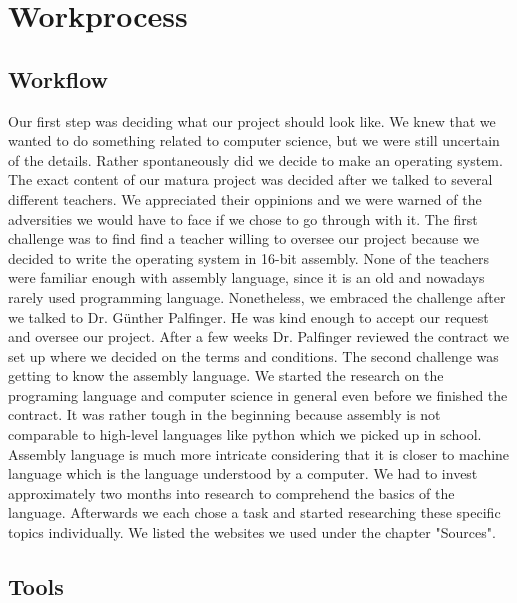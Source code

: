 \section{Workprocess}

\subsection{Workflow}

Our first step was deciding what our project should look like. We knew that we wanted to do something related to computer science, but we were still uncertain of the details. 
Rather spontaneously did we decide to make an operating system. The exact content of our matura project was decided after we talked to several different teachers. We 
appreciated their oppinions and we were warned of the adversities we would have to face if we chose to go through with it. The first challenge was to find find a teacher 
willing to oversee our project because we decided to write the operating system in 16-bit assembly. None of the teachers were familiar enough with assembly language, since
it is an old and nowadays rarely used programming language. Nonetheless, we embraced the challenge after we talked to Dr. Günther Palfinger. He was kind enough to accept our 
request and oversee our project. After a few weeks Dr. Palfinger reviewed the contract we set up where we decided on the terms and conditions. The second challenge was 
getting to know the assembly language. We started the research on the programing language and computer science in general even before we finished the contract. It was rather
tough in the beginning because assembly is not comparable to high-level languages like python which we picked up in school. Assembly language is much more intricate considering 
that it is closer to machine language which is the language understood by a computer. We had to invest approximately two months into research to comprehend the basics
of the language. Afterwards we each chose a task and started researching these specific topics individually. We listed the websites we used under the chapter "Sources".

\subsection{Tools}

